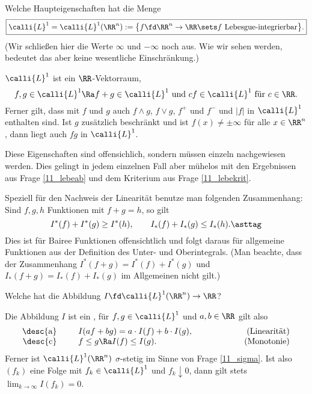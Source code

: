 \begin{frage}\label{11_lebesgue}
  Welche Haupteigenschaften hat die Menge 
  \[
  \boxed{
    \calli{L}^1 = \calli{L}^1 (\RR^n) := 
    \big\{ f \fd \RR^n \to \RR \sets \text{$f$ Lebesgue-integrierbar} \big\}.
  }
  \]
  (Wir schlie{\ss}en hier die Werte $\infty$ und $-\infty$ noch aus. 
  Wie wir sehen werden, bedeutet das aber keine wesentliche 
  Einschr\"ankung.)
\end{frage}

\begin{antwort}
  $\calli{L}^1$ ist ein $\RR$-Vektorraum, {\dasheisst} 
  \[
  f, g \in \calli{L}^1 \Ra f+g \in \calli{L}^1 \text{ und } 
  c f \in \calli{L}^1 \text{ für $c\in\RR$}.
  \]
  Ferner gilt, dass mit $f$ und $g$ auch 
  $f\wedge g$, $f\vee g$,
  $f^+$ und $f^{-}$ und $|f|$ in $\calli{L}^1$ enthalten sind.
  Ist $g$ zus\"atzlich beschr\"ankt und ist $f(x)\not=\pm \infty$ 
  f\"ur alle $x\in \RR^n$, dann liegt auch 
  $fg$ in $\calli{L}^1$. 

  Diese Eigenschaften sind  offensichlich, sondern 
  müssen einzeln nachgewiesen werden. Dies gelingt in jedem 
  einzelnen Fall aber mühelos mit den Ergebnissen aus Frage 
  \ref{11_lebeab} und dem Kriterium aus Frage \ref{11_lebekrit}.

  Speziell für den Nachweis der Linearität benutze man 
  folgenden Zusammenhang: Sind $f,g,h$ Funktionen mit $f+g=h$, so gilt
  \[
  I^*(f)+I^*(g) \ge I^*(h), \qquad
  I_*(f)+I_*(g) \le I_*(h). \asttag
  \]
  Dies ist für Baire\sch e Funktionen offensichtlich und folgt daraus 
  für allgemeine Funktionen aus der Definition des Unter- und Oberintegrals. 
  (Man beachte, dass der Zusammenhang $I^*(f+g)=I^*(f)+I^*(g)$ und 
  $I_*(f+g)=I_*(f)+I_*(g)$ im Allgemeinen nicht gilt.) \AntEnd 
\end{antwort} 

\begin{frage}
  Welche  hat die Abbildung 
  $I\fd\calli{L}^1(\RR^n)\to \RR$?
\end{frage} 

\begin{antwort}
  Die Abbildung $I$ ist ein , 
  für $f,g \in \calli{L}^1$ und $a,b\in \RR$ gilt also
  \[
  \begin{array}{rp{2mm}lp{15mm}r}
    \text{\desc{a}} & &
    I(a f+b g)= a \cdot I( f)+b\cdot I(g),  & &
    \text{(Linearität)} \\
    \text{\desc{c}} & &
    f \le g \Ra I(f) \le I(g ). & &
    \text{(Monotonie)}
  \end{array}
  \]
  Ferner ist $\calli{L}^1(\RR^n)$ $\sigma$-stetig 
  im Sinne von Frage \ref{11_sigma}.  
  Ist also $(f_k)$ eine Folge mit $f_k \in \calli{L}^1$ und 
  $f_k \downarrow 0$, dann gilt stets $\lim_{k\to\infty} I(f_k)=0$.
  \AntEnd
\end{antwort}

